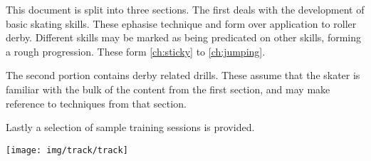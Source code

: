 This document is split into three sections. The first deals with the development of basic skating skills.  
These ephasise technique and form over application to roller derby.
Different skills may be marked as being predicated on other skills, forming a rough progression. 
These form \cref{ch:sticky} to \cref{ch:jumping}. 


The second portion contains derby related drills.
These assume that the skater is familiar with the bulk of the content from the first section, and may make reference to techniques from that section.  


Lastly a selection of sample training sessions is provided. 

\vspace{2cm}

\begin{center}
\texttt{[image: img/track/track]}
\end{center}
